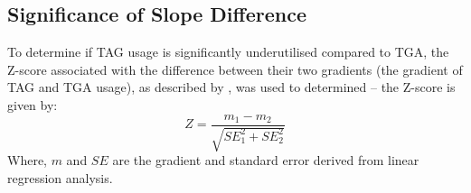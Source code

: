 \documentclass[../main.tex]{subfile}
\begin{document}
    \subsection{Significance of Slope Difference}
        To determine if TAG usage is significantly underutilised compared to TGA, the Z-score associated with the difference between their two gradients (the gradient of TAG and TGA usage), as described by \textcite{PATERNOSTER1998}, was used to determined -- the Z-score is given by:
        \begin{equation}
            Z = \frac{m_1 - m_2}{\sqrt{SE_1^2 + SE_2^2}}
        \end{equation}
        Where, $m$ and $SE$ are the gradient and standard error derived from linear regression analysis.
\end{document}
